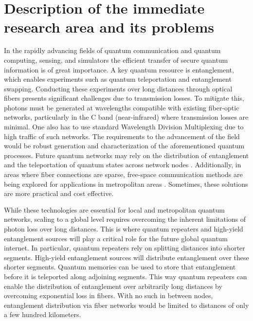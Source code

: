 \documentclass{article}
\theoremstyle{mytheoremstyle}
\theoremstyle{mytheoremstyle}
\theoremstyle{myproblemstyle}
\begin{document}

\section{Description of the immediate research area and its problems}

In the rapidly advancing fields of quantum communication and quantum computing, sensing, and simulators
the efficient transfer of secure quantum information is of great importance.
A key quantum resource is entanglement, which enables experiments such as quantum teleportation and entanglement swapping.
Conducting these experiments over long distances through optical fibers presents significant challenges due to transmission losses.
To mitigate this, photons must be generated at wavelengths compatible with existing fiber-optic networks,
particularly in the C band (near-infrared) where transmission losses are minimal.
One also has to use standard Wavelength Division Multiplexing due to high traffic of such networks.
The requirements to the advancement of the field would be robust generation and characterization of the aforementioned quantum processes.
Future quantum networks may rely on the distribution of entanglement and the teleportation of quantum states across network nodes \cite{Kimble_2008}.
Additionally, in areas where fiber connections are sparse,
free-space communication methods are being explored for applications in metropolitan areas \cite{Kržić_et_al_2023}. Sometimes,
these solutions are more practical and cost effective.
\par While these technologies are essential for local and metropolitan quantum networks, scaling to a global level requires overcoming
the inherent limitations of photon loss over long distances. This is where quantum repeaters and high-yield entanglement sources
will play a critical role for the future global quantum internet.
In particular, quantum repeaters rely on splitting distances into shorter segments. High-yield entanglement sources will distribute entanglement over these shorter segments.
Quantum memories can be used to store that entanglement before it is teleported along adjoining segments.
This way quantum repeaters can enable the distribution of entanglement over arbitrarily long distances by overcoming exponential loss in fibers.
With no such in between nodes, entanglement distribution via fiber networks would be limited to distances of only a few hundred kilometers.
\end{document}
